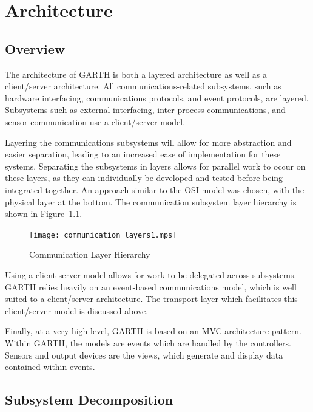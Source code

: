 \documentclass{report}
\begin{document}
\chapter{Architecture} %
\label{ch:architecture}

\section{Overview}
\label{sec:architecture_overview}

The architecture of GARTH is both a layered architecture as well as a
client/server architecture. All communications-related subsystems, such as
hardware interfacing, communications protocols, and event protocols, are
layered. Subsystems such as external interfacing, inter-process communications,
and sensor communication use a client/server model.

Layering the communications subsystems will allow for more abstraction and
easier separation, leading to an increased ease of implementation for these
systems. Separating the subsystems in layers allows for parallel work to occur
on these layers, as they can individually be developed and tested before being
integrated together. An approach similar to the OSI model was chosen, with the
physical layer at the bottom. The communication subsystem layer hierarchy is
shown in Figure~\ref{fig:communication_layers}.

\begin{figure}[hp]
    \centering
        \caption{Communication Layer Hierarchy}
        \scriptsize
        \setlength{\unitlength}{2.0em}
        \texttt{[image: communication\_layers1.mps]}
        \normalsize
    \label{fig:communication_layers}
\end{figure}

Using a client server model allows for work to be delegated across
subsystems. GARTH relies heavily on an event-based communications model, which
is well suited to a client/server architecture. The transport layer which
facilitates this client/server model is discussed above.

Finally, at a very high level, GARTH is based on an MVC architecture pattern.
Within GARTH, the models are events which are handled by the controllers. Sensors
and output devices are the views, which generate and display data contained within
events.

\section{Subsystem Decomposition}
\end{document}
